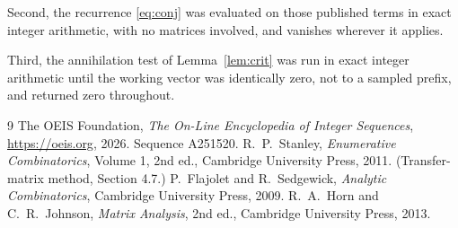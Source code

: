 \documentclass[11pt,a4paper]{article}
\theoremstyle{plain}
\theoremstyle{definition}
\begin{document}
Second, the recurrence \eqref{eq:conj} was evaluated on those published terms in exact
integer arithmetic, with no matrices involved, and vanishes wherever it applies.

Third, the annihilation test of Lemma~\ref{lem:crit} was run in exact integer arithmetic
until the working vector was identically zero, not to a sampled prefix, and returned zero
throughout.

\begin{thebibliography}{9}
 The OEIS Foundation, \emph{The On-Line Encyclopedia of Integer
Sequences}, \url{https://oeis.org}, 2026. Sequence A251520.
 R.~P.~Stanley, \emph{Enumerative Combinatorics}, Volume 1, 2nd ed.,
Cambridge University Press, 2011. (Transfer-matrix method, Section 4.7.)
 P.~Flajolet and R.~Sedgewick, \emph{Analytic Combinatorics}, Cambridge
University Press, 2009.
 R.~A.~Horn and C.~R.~Johnson, \emph{Matrix Analysis}, 2nd ed., Cambridge
University Press, 2013.
\end{thebibliography}
\end{document}
